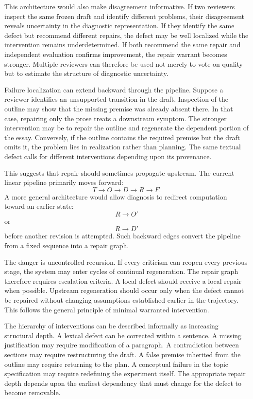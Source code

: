 \documentclass[11pt]{article}
\begin{document}
This architecture would also make disagreement informative. If two reviewers inspect the same frozen draft and identify different problems, their disagreement reveals uncertainty in the diagnostic representation. If they identify the same defect but recommend different repairs, the defect may be well localized while the intervention remains underdetermined. If both recommend the same repair and independent evaluation confirms improvement, the repair warrant becomes stronger. Multiple reviewers can therefore be used not merely to vote on quality but to estimate the structure of diagnostic uncertainty.

Failure localization can extend backward through the pipeline. Suppose a reviewer identifies an unsupported transition in the draft. Inspection of the outline may show that the missing premise was already absent there. In that case, repairing only the prose treats a downstream symptom. The stronger intervention may be to repair the outline and regenerate the dependent portion of the essay. Conversely, if the outline contains the required premise but the draft omits it, the problem lies in realization rather than planning. The same textual defect calls for different interventions depending upon its provenance.

This suggests that repair should sometimes propagate upstream. The current linear pipeline primarily moves forward:
\[
    T\rightarrow O\rightarrow D\rightarrow R\rightarrow F.
\]
A more general architecture would allow diagnosis to redirect computation toward an earlier state:
\[
    R\rightarrow O'
\]
or
\[
    R\rightarrow D'
\]
before another revision is attempted. Such backward edges convert the pipeline from a fixed sequence into a repair graph.

The danger is uncontrolled recursion. If every criticism can reopen every previous stage, the system may enter cycles of continual regeneration. The repair graph therefore requires escalation criteria. A local defect should receive a local repair when possible. Upstream regeneration should occur only when the defect cannot be repaired without changing assumptions established earlier in the trajectory. This follows the general principle of minimal warranted intervention.

The hierarchy of interventions can be described informally as increasing structural depth. A lexical defect can be corrected within a sentence. A missing justification may require modification of a paragraph. A contradiction between sections may require restructuring the draft. A false premise inherited from the outline may require returning to the plan. A conceptual failure in the topic specification may require redefining the experiment itself. The appropriate repair depth depends upon the earliest dependency that must change for the defect to become removable.
\end{document}

